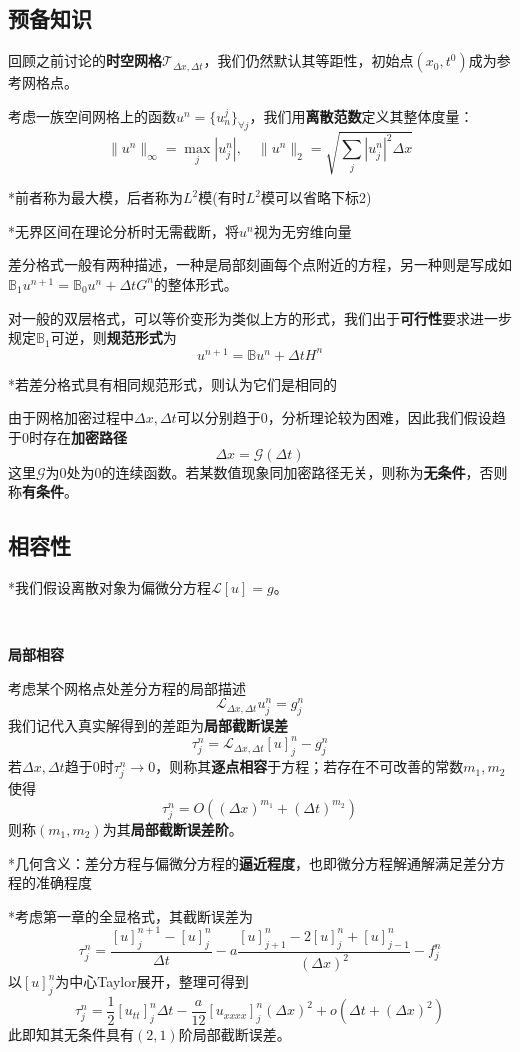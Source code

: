 \documentclass[a4paper,UTF8,fontset=windows]{ctexart}
\begin{document}
\subsection{预备知识}
回顾之前讨论的\textbf{时空网格}$\mathcal{T}_{\Delta x,\Delta t}$，我们仍然默认其等距性，初始点$(x_0,t^0)$成为参考网格点。

考虑一族空间网格上的函数$u^n=\{u_n^j\}_{\forall j}$，我们用\textbf{离散范数}定义其整体度量：
$$\|u^n\|_\infty=\max_j|u_j^n|,\quad\|u^n\|_2=\sqrt{\sum_j|u^n_j|^2\Delta x}$$

*前者称为最大模，后者称为$L^2$模(有时$L^2$模可以省略下标2)

*无界区间在理论分析时无需截断，将$u^n$视为无穷维向量

差分格式一般有两种描述，一种是局部刻画每个点附近的方程，另一种则是写成如$\mathbb{B}_1u^{n+1}=\mathbb{B}_0u^n+\Delta t G^n$的整体形式。

对一般的双层格式，可以等价变形为类似上方的形式，我们出于\textbf{可行性}要求进一步规定$\mathbb{B}_1$可逆，则\textbf{规范形式}为
$$u^{n+1}=\mathbb{B}u^n+\Delta tH^n$$

*若差分格式具有相同规范形式，则认为它们是相同的

由于网格加密过程中$\Delta x,\Delta t$可以分别趋于0，分析理论较为困难，因此我们假设趋于0时存在\textbf{加密路径}
$$\Delta x=\mathcal{G}(\Delta t)$$
这里$\mathcal{G}$为0处为0的连续函数。若某数值现象同加密路径无关，则称为\textbf{无条件}，否则称\textbf{有条件}。

\subsection{相容性}
*我们假设离散对象为偏微分方程$\mathcal{L}[u]=g$。

\

\textbf{局部相容}

考虑某个网格点处差分方程的局部描述
$$\mathcal{L}_{\Delta x,\Delta t}u_j^n=g_j^n$$
我们记代入真实解得到的差距为\textbf{局部截断误差}
$$\tau_j^n=\mathcal{L}_{\Delta x,\Delta t}[u]_j^n-g_j^n$$
若$\Delta x,\Delta t$趋于0时$\tau_j^n\to0$，则称其\textbf{逐点相容}于方程；若存在不可改善的常数$m_1,m_2$使得
$$\tau_j^n=O((\Delta x)^{m_1}+(\Delta t)^{m_2})$$
则称$(m_1,m_2)$为其\textbf{局部截断误差阶}。

*几何含义：差分方程与偏微分方程的\textbf{逼近程度}，也即微分方程解通解满足差分方程的准确程度

*考虑第一章的全显格式，其截断误差为
$$\tau_j^n=\frac{[u]_j^{n+1}-[u]_j^n}{\Delta t}-a\frac{[u]_{j+1}^n-2[u]_j^n+[u]_{j-1}^n}{(\Delta x)^2}-f_j^n$$
以$[u]_j^n$为中心Taylor展开，整理可得到
$$\tau_j^n=\frac{1}{2}[u_{tt}]_j^n\Delta t-\frac{a}{12}[u_{xxxx}]_j^n(\Delta x)^2+o(\Delta t+(\Delta x)^2)$$
此即知其无条件具有$(2,1)$阶局部截断误差。
\end{document}
